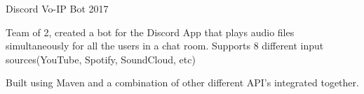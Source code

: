 \cventry
    {Discord Vo-IP Bot} %
    {} %
    {} %
    {2017} %
    {
    \begin{cvitems}
        \item{Team of 2, created a bot for the Discord App that plays audio files simultaneously for all the users in a chat room. Supports 8 different input sources(YouTube, Spotify, SoundCloud, etc)}
        \item{Built using Maven and a combination of other different API’s integrated together.}
    \end{cvitems}
    }